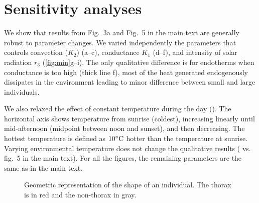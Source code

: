 \documentclass[11pt]{article}
\begin{document}
\section{Sensitivity analyses}

We show that results from Fig.~3a and Fig.~5 in the main text are generally robust to parameter changes.
We varied independently the parameters that controls convection ($K_2$) (a--c), conductance $K_1$ (d--f), and intensity of solar radiation $r_3$ (\cref{fig:min}g--i).
The only qualitative difference is for endotherms when conductance is too high (thick line f), most of the heat generated endogenously dissipates in the environment leading to minor difference between small and large individuals.

We also relaxed the effect of constant temperature during the day ().
The horizontal axis shows temperature from sunrise (coldest), increasing linearly until mid-afternoon (midpoint between noon and sunset), and then decreasing.
The hottest temperature is defined as $10 ^{\circ}\rm{C}$ hotter than the temperature at sunrise.
Varying environmental temperature does not change the qualitative results ( vs. fig.~5 in the main text).
For all the figures, the remaining parameters are the same as in the main text.

\begin{figure}
\begin{center}
	\caption{
		\setstretch{\stretchby}
		Geometric representation of the shape of an individual.
		The thorax is in red and the non-thorax in gray.
	}
	\label{fig:geo}
\end{center}
\end{figure}
\end{document}
